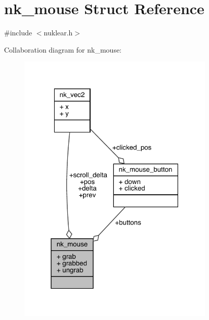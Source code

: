\hypertarget{structnk__mouse}{}\section{nk\+\_\+mouse Struct Reference}
\label{structnk__mouse}


{\ttfamily \#include $<$nuklear.\+h$>$}



Collaboration diagram for nk\+\_\+mouse\+:
\nopagebreak
\begin{figure}[H]
\begin{center}
\leavevmode
\includegraphics[width=268pt]{structnk__mouse__coll__graph}
\end{center}
\end{figure}
